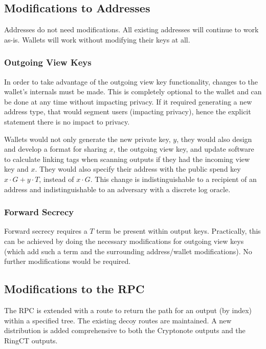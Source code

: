 \documentclass[]{article}
\begin{document}
\subsection{Modifications to Addresses}

Addresses do not need modifications. All existing addresses will continue to work as-is. Wallets will work without modifying their keys at all.

\subsubsection{Outgoing View Keys}

In order to take advantage of the outgoing view key functionality, changes to the wallet's internals must be made. This is completely optional to the wallet and can be done at any time without impacting privacy. If it required generating a new address type, that would segment users (impacting privacy), hence the explicit statement there is no impact to privacy.

Wallets would not only generate the new private key, $y$, they would also design and develop a format for sharing $x$, the outgoing view key, and update software to calculate linking tags when scanning outputs if they had the incoming view key and $x$. They would also specify their address with the public spend key $x \cdot G + y \cdot T$, instead of $x \cdot G$. This change is indistinguishable to a recipient of an address and indistinguishable to an adversary with a discrete log oracle.

\subsubsection{Forward Secrecy}

Forward secrecy requires a $T$ term be present within output keys. Practically, this can be achieved by doing the necessary modifications for outgoing view keys (which add such a term and the surrounding address/wallet modifications). No further modifications would be required.

\subsection{Modifications to the RPC}

The RPC is extended with a route to return the path for an output (by index) within a specified tree. The existing decoy routes are maintained. A new distribution is added comprehensive to both the Cryptonote outputs and the RingCT outputs.
\end{document}
